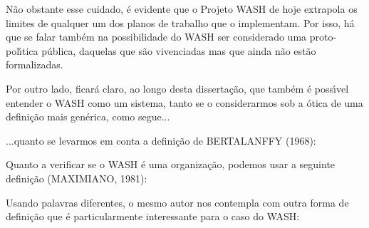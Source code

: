 \documentclass[
12pt,		%
openright,	%
twoside,  %
a4paper,			%
chapter=TITLE,		%
english,			%
french,				%
spanish,			%
brazil				%
]{USPSC-classe/USPSC}
\begin{document}
N\~ao obstante esse cuidado, \'e evidente que o Projeto WASH de hoje extrapola os limites de qualquer um dos planos de trabalho que o implementam. Por isso, h\'a que se falar tamb\'em na possibilidade do WASH ser considerado uma proto-pol\'{\i}tica p\'ublica, daquelas que s\~ao vivenciadas mas que ainda n\~ao est\~ao formalizadas.




Por outro lado, ficar\'a claro, ao longo desta disserta\c{c}\~ao, que tamb\'em \'e poss\'{\i}vel entender o WASH como um sistema, tanto se o considerarmos sob a \'otica de uma defini\c{c}\~ao mais gen\'erica, como segue...





\noindent\begin{center}\mbox{\centering{}}\end{center}


...quanto se levarmos em conta a defini\c{c}\~ao de  BERTALANFFY (1968):





\noindent\begin{center}\mbox{\centering{}}\end{center}


Quanto a verificar se o WASH \'e uma organiza\c{c}\~ao, podemos usar a seguinte defini\c{c}\~ao  (MAXIMIANO, 1981):





\noindent\begin{center}\mbox{\centering{}}\end{center}


Usando palavras diferentes, o mesmo autor nos contempla com outra forma de defini\c{c}\~ao que \'e particularmente interessante para o caso do WASH:
\end{document}
